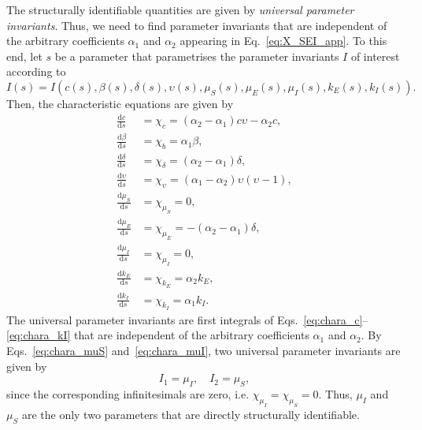 \documentclass[12pt]{article}
\begin{document}
The structurally identifiable quantities are given by \textit{universal parameter invariants}. Thus, we need to find parameter invariants that are independent of the arbitrary coefficients $\alpha_{1}$ and $\alpha_{2}$ appearing in Eq.~\eqref{eq:X_SEI_app}. To this end, let $s$ be a parameter that parametrises the parameter invariants $I$ of interest according to
\begin{equation}
I(s)=I(c(s),\beta(s),\delta(s),\upsilon(s),\mu_{S}(s),\mu_{E}(s),\mu_{I}(s),k_{E}(s),k_{I}(s)).
\label{eq:I_SEI}
\end{equation}
Then, the characteristic equations are given by
\begin{align}
  \frac{\mathrm{d}c}{\mathrm{d}s}&=\chi_{c}=(\alpha_{2}-\alpha_{1})c\upsilon-\alpha_{2}c,\label{eq:chara_c}\\
  \frac{\mathrm{d}\beta}{\mathrm{d}s}&=\chi_{b}=\alpha_{1}\beta,\label{eq:chara_beta}\\
  \frac{\mathrm{d}\delta}{\mathrm{d}s}&=\chi_{\delta}=(\alpha_{2}-\alpha_{1})\delta,\label{eq:chara_delta}\\
  \frac{\mathrm{d}\upsilon}{\mathrm{d}s}&=\chi_{\upsilon}=(\alpha_{1}-\alpha_{2})\upsilon \left(\upsilon - 1\right),\label{eq:chara_epsilon}\\
  \frac{\mathrm{d}\mu_{S}}{\mathrm{d}s}&=\chi_{\mu_{S}}=0,\label{eq:chara_muS}\\
  \frac{\mathrm{d}\mu_{E}}{\mathrm{d}s}&=\chi_{\mu_{E}}=-(\alpha_{2}-\alpha_{1})\delta,\label{eq:chara_muE}\\
  \frac{\mathrm{d}\mu_{I}}{\mathrm{d}s}&=\chi_{\mu_{I}}=0,\label{eq:chara_muI}\\
  \frac{\mathrm{d}k_{E}}{\mathrm{d}s}&=\chi_{k_{E}}=\alpha_{2}k_{E},\label{eq:chara_kE}\\
  \frac{\mathrm{d}k_{I}}{\mathrm{d}s}&=\chi_{k_{I}}=\alpha_{1}k_{I}.\label{eq:chara_kI}  
\end{align}
The universal parameter invariants are first integrals of Eqs.~\eqref{eq:chara_c}--\eqref{eq:chara_kI} that are independent of the arbitrary coefficients $\alpha_{1}$ and $\alpha_{2}$. By Eqs.~\eqref{eq:chara_muS} and~\eqref{eq:chara_muI}, two universal parameter invariants are given by
\begin{equation}
    I_{1}=\mu_{I},\quad I_{2}=\mu_{S},
\label{eq:SEI_I_1_and_I_2_app}
\end{equation}
since the corresponding infinitesimals are zero, i.e. $\chi_{\mu_{I}}=\chi_{\mu_{S}}=0$. Thus, $\mu_{I}$ and $\mu_{S}$ are the only two parameters that are directly structurally identifiable. 
\end{document}
